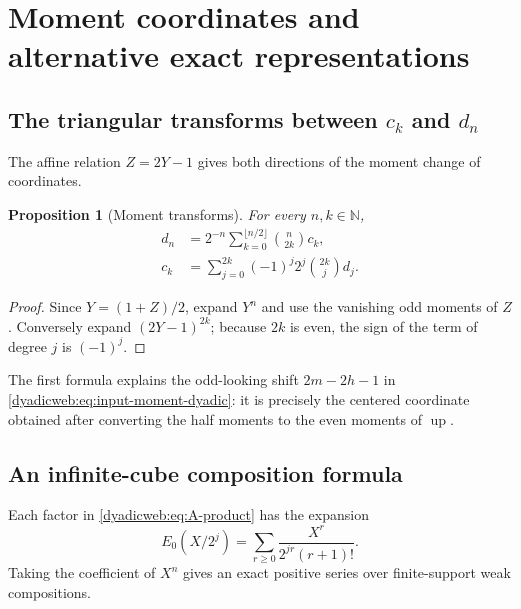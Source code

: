 \documentclass[11pt,oneside]{article}
\newtheorem{proposition}[proposition]{Proposition}
\theoremstyle{definition}
\theoremstyle{remark}
\newcommand{\N}{\mathbb N}
\newcommand{\Up}{\operatorname{up}}
\begin{document}
\section{Moment coordinates and alternative exact representations}
\label{dyadicweb:sec:moment-alternatives}

\subsection[The triangular transforms between the c and d sequences]{The triangular transforms between $c_k$ and $d_n$}

The affine relation $Z=2Y-1$ gives both directions of the moment change of coordinates.

\begin{proposition}[Moment transforms]
\label{dyadicweb:prop:moment-transforms}
For every $n,k\in\N$,
\begin{align}
 d_n
 &=2^{-n}\sum_{k=0}^{\lfloor n/2\rfloor}\binom n{2k}c_k,
                                                               \label{dyadicweb:eq:d-from-c-new}\\
 c_k
 &=\sum_{j=0}^{2k}(-1)^j2^j\binom{2k}{j}d_j.              \label{dyadicweb:eq:c-from-d-new}
\end{align}
\end{proposition}

\begin{proof}
Since $Y=(1+Z)/2$, expand $Y^n$ and use the vanishing odd moments of $Z$.  Conversely expand
$(2Y-1)^{2k}$; because $2k$ is even, the sign of the term of degree $j$ is $(-1)^j$.
\end{proof}

The first formula explains the odd-looking shift $2m-2h-1$ in
\eqref{dyadicweb:eq:input-moment-dyadic}: it is precisely the centered coordinate obtained after
converting the half moments to the even moments of $\Up$.

\subsection{An infinite-cube composition formula}

Each factor in \eqref{dyadicweb:eq:A-product} has the expansion
\[
 E_0(X/2^j)=\sum_{r\ge0}\frac{X^r}{2^{jr}(r+1)!}.
\]
Taking the coefficient of $X^n$ gives an exact positive series over finite-support weak
compositions.
\end{document}
